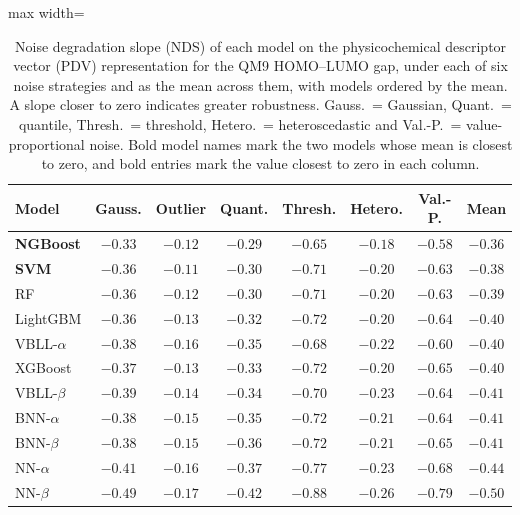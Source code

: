 \begin{table}[htbp]
\centering
\small
\begin{adjustbox}{max width=\textwidth}
\begin{tabular}{lccccccc}
\toprule
\textbf{Model} & \textbf{Gauss.} & \textbf{Outlier} & \textbf{Quant.} & \textbf{Thresh.} & \textbf{Hetero.} & \textbf{Val.-P.} & \textbf{Mean} \\
\midrule
\textbf{NGBoost}    & $\mathbf{-0.33}$ & $-0.12$ & $\mathbf{-0.29}$ & $\mathbf{-0.65}$ & $\mathbf{-0.18}$ & $\mathbf{-0.58}$ & $\mathbf{-0.36}$ \\
\textbf{SVM}        & $-0.36$ & $\mathbf{-0.11}$ & $-0.30$ & $-0.71$ & $-0.20$ & $-0.63$ & $-0.38$ \\
RF                  & $-0.36$ & $-0.12$ & $-0.30$ & $-0.71$ & $-0.20$ & $-0.63$ & $-0.39$ \\
LightGBM            & $-0.36$ & $-0.13$ & $-0.32$ & $-0.72$ & $-0.20$ & $-0.64$ & $-0.40$ \\
VBLL-$\alpha$       & $-0.38$ & $-0.16$ & $-0.35$ & $-0.68$ & $-0.22$ & $-0.60$ & $-0.40$ \\
XGBoost             & $-0.37$ & $-0.13$ & $-0.33$ & $-0.72$ & $-0.20$ & $-0.65$ & $-0.40$ \\
VBLL-$\beta$        & $-0.39$ & $-0.14$ & $-0.34$ & $-0.70$ & $-0.23$ & $-0.64$ & $-0.41$ \\
BNN-$\alpha$        & $-0.38$ & $-0.15$ & $-0.35$ & $-0.72$ & $-0.21$ & $-0.64$ & $-0.41$ \\
BNN-$\beta$         & $-0.38$ & $-0.15$ & $-0.36$ & $-0.72$ & $-0.21$ & $-0.65$ & $-0.41$ \\
NN-$\alpha$         & $-0.41$ & $-0.16$ & $-0.37$ & $-0.77$ & $-0.23$ & $-0.68$ & $-0.44$ \\
NN-$\beta$          & $-0.49$ & $-0.17$ & $-0.42$ & $-0.88$ & $-0.26$ & $-0.79$ & $-0.50$ \\
\bottomrule
\end{tabular}
\end{adjustbox}
\caption[Noise degradation slope by model on PDV for QM9.]{Noise degradation slope (NDS) of each model on the physicochemical descriptor vector (PDV) representation for the QM9 HOMO--LUMO gap, under each of six noise strategies and as the mean across them, with models ordered by the mean. A slope closer to zero indicates greater robustness. Gauss.\ = Gaussian, Quant.\ = quantile, Thresh.\ = threshold, Hetero.\ = heteroscedastic and Val.-P.\ = value-proportional noise. Bold model names mark the two models whose mean is closest to zero, and bold entries mark the value closest to zero in each column.}
\label{tab:nds_ranking}
\end{table}


